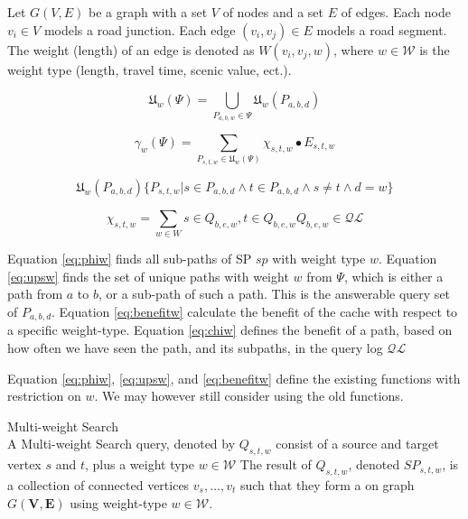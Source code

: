 \begin{definition}
Let $G(V, E)$ be a graph with a set $V$ of nodes and a set $E$ of edges.
Each node $v_i \in V$ models a road junction. Each edge $(v_i, v_j) \in
E$ models a road segment. The weight (length) of an edge is denoted as $W(v_i, v_j, w)$, where $w \in \mathcal{W}$ is the weight type (length, travel time, scenic value, ect.).
\end{definition}


\begin{equation} \label{eq:upsw}
 \mathfrak{U}_w(\Psi) = \bigcup\limits_{P_{a,b,w} \in \Psi} \mathfrak{U}_w(P_{a,b,d})
\end{equation}

\begin{equation} \label{eq:benefitw}
\gamma_w(\Psi) = \sum\limits_{P_{s,t,w} \in \mathfrak{U}_w(\Psi)} \chi_{s,t,w} \bullet E_{s,t,w}
\end{equation}

\begin{equation} \label{eq:phiw}
\mathfrak{U}_w(P_{a,b,d}) \{ P_{s,t,w} | s \in P_{a,b,d} \wedge t \in P_{a,b,d} \wedge s \neq t \wedge d = w\}
\end{equation}

\begin{equation} \label{eq:chiw}
\chi_{s,t,w} =  \sum\limits_{w \in W } s \in Q_{b,e,w}, t \in Q_{b,e,w}  Q_{b,e,w} \in \mathcal{QL} 
\end{equation}



Equation \ref{eq:phiw} finds all sub-paths of SP $sp$ with weight type $w$. 
Equation \ref{eq:upsw} finds the set of unique paths with weight $w$ from $\Psi$, which is either a path from $a$ to $b$, or a sub-path of such a path. This is the answerable query set of $P_{a,b,d}$.
Equation \ref{eq:benefitw} calculate the benefit of the cache with respect to a specific weight-type.
Equation \ref{eq:chiw} defines the benefit of a path, based on how often we have seen the path, and its subpaths, in the query log $\mathcal{QL}$

Equation \ref{eq:phiw}, \ref{eq:upsw}, and \ref{eq:benefitw} define the existing functions with restriction on $w$. We may however still consider using the old functions.

\begin{definition}{Multi-weight Search}\\
A Multi-weight Search query, denoted by $Q_{s,t,w}$ consist of a source and target vertex $s$ and $t$, plus a weight type $w \in \mathcal{W}$ 
The result of $Q_{s,t,w}$, denoted $SP_{s,t,w}$, is a collection of connected vertices $v_s,\dotsc,v_t$ such that they form a \spath on graph $G\mathbf{(V,E)}$ using weight-type $w \in \mathcal{W}$.
\end{definition}


